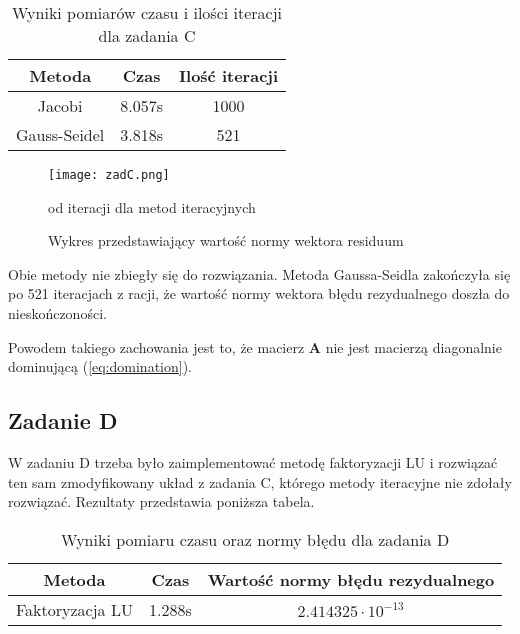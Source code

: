 \documentclass{article}
\begin{document}
\begin{table}[H]
    \begin{center}
        \begin{tabular}{| c | c | c |} 
        \hline
        Metoda & Czas & Ilość iteracji \\
        \hline
        Jacobi & 8.057s & 1000 \\
        \hline
        Gauss-Seidel & 3.818s & 521 \\
        \hline
        \end{tabular}
        \caption{Wyniki pomiarów czasu i ilości iteracji dla zadania C}
    \end{center}
\end{table}

\begin{figure}[H]
    \texttt{[image: zadC.png]}
    \centering
    \caption{Wykres przedstawiający wartość normy wektora residuum}
    {od iteracji dla metod iteracyjnych}
\end{figure}

Obie metody nie zbiegły się do rozwiązania. Metoda Gaussa-Seidla zakończyła się
po 521 iteracjach z racji, że wartość normy wektora błędu rezydualnego doszła do nieskończoności.

Powodem takiego zachowania jest to, że macierz $\boldsymbol{A}$ nie jest
macierzą diagonalnie dominującą (\ref {eq:domination}).

\subsection{Zadanie D}
W zadaniu D trzeba było zaimplementować metodę faktoryzacji LU
i rozwiązać ten sam zmodyfikowany układ z zadania C, którego metody iteracyjne
nie zdołały rozwiązać. Rezultaty przedstawia poniższa tabela.

\begin{table}[H]
    \begin{center}
        \begin{tabular}{| c | c | c |} 
        \hline
        Metoda & Czas & Wartość normy błędu rezydualnego \\
        \hline
        \rule{0pt}{2.5ex}   
        Faktoryzacja LU & 1.288s & $2.414325 \cdot 10^{-13}$  \\
        \hline
        \end{tabular}
        \caption{Wyniki pomiaru czasu oraz normy błędu dla zadania D}
    \end{center}
\end{table}
\end{document}
